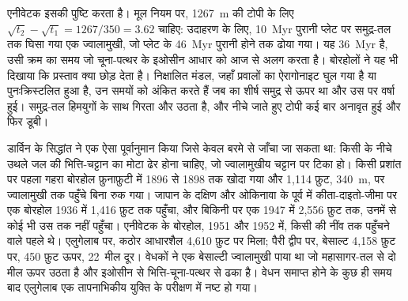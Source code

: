 एनीवेटक इसकी पुष्टि करता है। मूल नियम पर, \qty{1267}{m} की टोपी के लिए $\sqrt{t_2} - \sqrt{t_1} =
1267/350 = 3.62$ चाहिए: उदाहरण के लिए, \qty{10}{Myr} पुरानी प्लेट पर समुद्र-तल तक घिसा गया एक ज्वालामुखी, जो
प्लेट के \qty{46}{Myr} पुरानी होने तक ढोया गया। यह \qty{36}{Myr} है, उसी क्रम का समय जो
चूना-पत्थर के इओसीन आधार को आज से अलग करता है। बोरहोलों ने यह भी दिखाया कि
प्रस्ताव क्या छोड़ देता है। निक्षालित मंडल, जहाँ प्रवालों का ऐरागोनाइट घुल गया है या
पुनःक्रिस्टलित हुआ है, उन समयों को अंकित करते हैं जब  का शीर्ष समुद्र से ऊपर था और उस पर वर्षा हुई।
समुद्र-तल हिमयुगों के साथ गिरता और उठता है, और नीचे जाते हुए टोपी कई बार
अनावृत हुई और फिर डूबी।

\begin{history}[एटॉलों के आर-पार वेधन, 1896--1952]
डार्विन के सिद्धांत ने एक ऐसा पूर्वानुमान किया जिसे केवल बरमे से जाँचा जा सकता था: किसी  के नीचे
उथले जल की भित्ति-चट्टान का मोटा ढेर होना चाहिए, जो ज्वालामुखीय चट्टान पर टिका हो। किसी प्रशांत  पर
पहला गहरा बोरहोल फ़ुनाफ़ुटी में 1896 से 1898 तक खोदा गया और 1,114 फ़ुट,
\qty{340}{m}, पर ज्वालामुखी तक पहुँचे बिना रुक गया। जापान के दक्षिण और ओकिनावा के पूर्व में कीता-दाइतो-जीमा पर एक बोरहोल
1936 में 1,416 फ़ुट तक पहुँचा, और बिकिनी पर एक 1947 में 2,556 फ़ुट तक, उनमें से कोई भी उस तक नहीं पहुँचा। एनीवेटक के बोरहोल,
1951 और 1952 में, किसी  की नींव तक पहुँचने वाले पहले थे। एलुगेलाब पर, कठोर आधारशैल
4,610 फ़ुट पर मिला; पैरी द्वीप पर, बेसाल्ट 4,158 फ़ुट पर, 450 फ़ुट ऊपर, \num{22}~मील
दूर। वेधकों ने एक बेसाल्टी ज्वालामुखी पाया था जो महासागर-तल से दो मील ऊपर उठता है और
इओसीन से भित्ति-चूना-पत्थर से ढका है। वेधन समाप्त होने के कुछ ही समय बाद एलुगेलाब एक तापनाभिकीय युक्ति के
परीक्षण में नष्ट हो गया।
\end{history}

